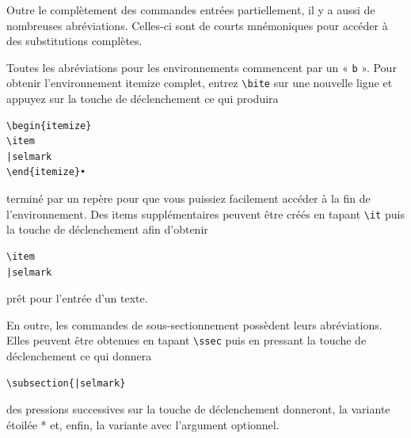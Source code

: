 \documentclass[11pt,french]{article}
\newcommand{\cmd}[1]{\textsf{#1}}
\begin{document}
Outre le complètement des commandes entrées partiellement, il y a aussi de nombreuses abréviations. Celles-ci sont de courts mnémoniques pour accéder à des substitutions complètes.

Toutes les abréviations pour les environnements commencent par un « \texttt{b} ». Pour obtenir l'environnement  \cmd{itemize} complet, entrez \verb|\bite| sur une nouvelle ligne et appuyez sur la touche de déclenchement ce qui produira

%
\begin{verbatim}
\begin{itemize}
\item
|selmark
\end{itemize}•
\end{verbatim}
terminé par un repère pour que vous puissiez facilement accéder à la fin de l'environnement. Des items supplémentaires peuvent être créés en tapant \verb|\it| puis la touche de déclenchement afin d'obtenir
\begin{verbatim}
\item
|selmark
\end{verbatim}
prêt pour l'entrée d'un texte.

En outre, les commandes de sous-sectionnement possèdent leurs abréviations. Elles peuvent être obtenues en tapant  \verb|\ssec| puis en pressant la touche de déclenchement ce qui donnera

\begin{verbatim}
\subsection{|selmark}
\end{verbatim}
des pressions successives sur la touche de déclenchement donneront, la variante étoilée * et, enfin, la variante avec l'argument optionnel.
\end{document}
